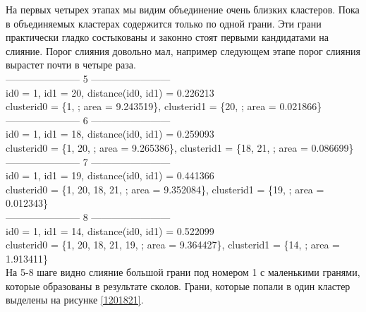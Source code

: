 \documentclass[a4paper,12pt, titlepage]{article}
\begin{document}
На первых четырех этапах мы видим объединение очень близких кластеров. Пока в объединяемых кластерах содержится только 
по одной грани. Эти грани практически гладко состыкованы и законно стоят первыми кандидатами на слияние. Порог слияния довольно мал, например следующем этапе порог слияния вырастет почти в четыре раза. 
\\

\noindent
-----------------------    5    ------------------------\\
id0 = 1, id1 = 20, distance(id0, id1) = 0.226213\\
clusterid0 = \{1, ; area = 9.243519\}, clusterid1 = \{20, ; area = 0.021866\}\\
-----------------------    6    ------------------------\\
id0 = 1, id1 = 18, distance(id0, id1) = 0.259093\\
clusterid0 = \{1, 20, ; area = 9.265386\}, clusterid1 = \{18, 21, ; area = 0.086699\}\\
-----------------------    7    ------------------------\\
id0 = 1, id1 = 19, distance(id0, id1) = 0.441366\\
clusterid0 = \{1, 20, 18, 21, ; area = 9.352084\}, clusterid1 = \{19, ; area = 0.012343\}\\
-----------------------    8    ------------------------\\
id0 = 1, id1 = 14, distance(id0, id1) = 0.522099\\
clusterid0 = \{1, 20, 18, 21, 19, ; area = 9.364427\}, clusterid1 = \{14, ; area = 1.913411\}\\

На 5-8 шаге видно слияние большой грани под номером 1 с маленькими гранями, которые образованы в результате сколов.
Грани, которые попали в один кластер выделены на рисунке \ref{1201821}.  
\\

\noindent
\newpage
\end{document}
